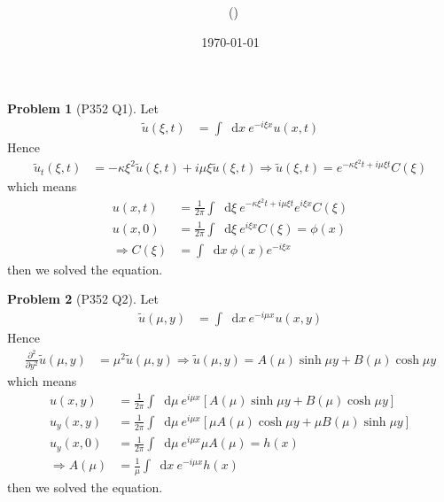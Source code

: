 \documentclass[twoside,11pt]{article}
\title{{\sffamily \Code \ \Ass}}
\author{\sffamily \name \ (\href{mailto:\mail}{\mail})}
\date{\sffamily \today}
\makeatletter
\renewcommand*\d{\mathop{}\!\mathrm{d}}
\theoremstyle{definition}
\newtheorem{problem}{Problem}
\theoremstyle{remark}
\newtheorem*{remark}{Remark}
\renewcommand{\maketitle}{\bgroup\setlength{\parindent}{0pt}
\begin{flushleft}
  \textbf{\Large\@title}

  \@author
\end{flushleft}\egroup
}
\makeatother
\begin{document}
\maketitle
\thispagestyle{title}


\begin{problem}[P352 Q1]
Let 
\begin{align*}
    \tilde{u}(\xi, t) &= 
    \int\d x \ e^{-i\xi x} u(x, t)
\end{align*}
Hence
\begin{align*}
    \tilde{u}_t(\xi, t) &= -\kappa\xi^2\tilde{u}(\xi, t)
    + i\mu\xi\tilde{u}(\xi, t)
    \Rightarrow
    \tilde{u}(\xi, t) =
    e^{-\kappa\xi^2 t + i\mu\xi t}C(\xi)
\end{align*}
which means
\begin{align*}
    u(x, t) &= 
    \frac{1}{2\pi}\int\d\xi\ e^{-\kappa\xi^2 t + i\mu\xi t} e^{i\xi x}C(\xi)\\
    u(x, 0) &= 
    \frac{1}{2\pi}\int\d\xi\ e^{i\xi x}C(\xi) = \phi(x)\\
    \Rightarrow C(\xi) &= \int\d x\ \phi(x)e^{-i\xi x}
\end{align*}
then we solved the equation.

\end{problem}


\begin{problem}[P352 Q2]
Let
\begin{align*}
    \tilde{u}(\mu, y) &= 
    \int\d x\ e^{-i\mu x}u(x, y)
\end{align*}
Hence
\begin{align*}
    \frac{\partial^2}{\partial y^2}\tilde{u}(\mu, y) &= 
    \mu^2\tilde{u}(\mu, y)\Rightarrow
    \tilde{u}(\mu, y) = A(\mu)\sinh\mu y + B(\mu)\cosh\mu y
\end{align*}
which means
\begin{align*}
    u(x, y) &= \frac{1}{2\pi}\int\d\mu\ e^{i\mu x}[A(\mu)\sinh\mu y + B(\mu)\cosh\mu y]\\
    u_y(x, y) &= \frac{1}{2\pi}\int\d\mu\ e^{i\mu x}[\mu A(\mu)\cosh\mu y + \mu B(\mu)\sinh\mu y]\\
    u_y(x, 0) &= \frac{1}{2\pi}\int\d\mu\ e^{i\mu x}\mu A(\mu) = h(x)\\
    \Rightarrow A(\mu) &= \frac{1}{\mu}\int\d x\ e^{-i\mu x}h(x)
\end{align*}
then we solved the equation.


\end{problem}





\end{document}
